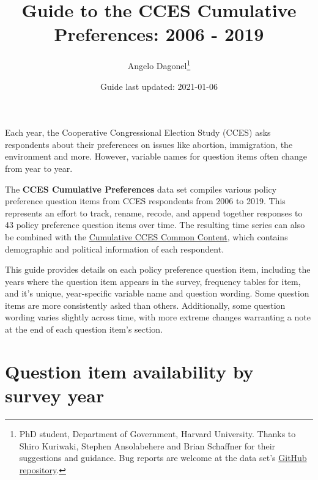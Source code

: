 \documentclass[12pt]{article}
\title{Guide to the CCES Cumulative Preferences: 2006 - 2019}
\author{Angelo Dagonel\footnote{PhD student, Department of Government, Harvard
  University. Thanks to Shiro Kuriwaki, Stephen Ansolabehere and Brian
  Schaffner for their suggestions and guidance. Bug reports are welcome
  at the data set's
  \href{https://github.com/psjello/cces_cumulative_preferences}{GitHub
  repository}.}}
\date{Guide last updated: 2021-01-06}
\begin{document}
\maketitle

Each year, the Cooperative Congressional Election Study (CCES) asks
respondents about their preferences on issues like abortion,
immigration, the environment and more. However, variable names for
question items often change from year to year.

\bigskip
The \textbf{CCES Cumulative Preferences} data set compiles various
policy preference question items from CCES respondents from 2006 to
2019. This represents an effort to track, rename, recode, and append
together responses to 43 policy preference question items over time. The
resulting time series can also be combined with the
\href{https://doi.org/10.7910/DVN/II2DB6}{Cumulative CCES Common
Content}, which contains demographic and political information of each
respondent.

\bigskip
This guide provides details on each policy preference question item,
including the years where the question item appears in the survey,
frequency tables for item, and it's unique, year-specific variable name
and question wording. Some question items are more consistently asked
than others. Additionally, some question wording varies slightly across
time, with more extreme changes warranting a note at the end of each
question item's section.

\newpage

\tableofcontents

\section{Question item availability by survey
year}\label{question-item-availability-by-survey-year}
\end{document}
